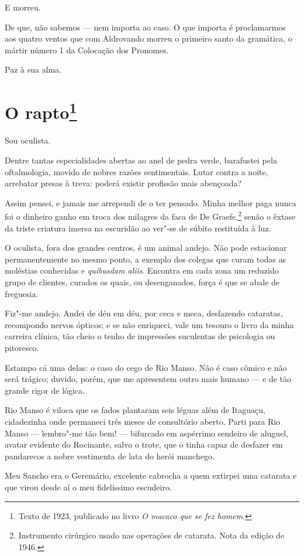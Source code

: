 E morreu.

De que, não sabemos --- nem importa ao caso. O que importa é
proclamarmos aos quatro ventos que com Aldrovando morreu o primeiro
santo da gramática, o mártir número 1 da Colocação dos Pronomes.

Paz à sua alma.

\chapter{O rapto\footnote[*]{Texto de 1923, publicado no livro \emph{O macaco que se fez homem}.}}

Sou oculista.

Dentre tantas especialidades abertas ao anel de pedra verde, barafustei
pela oftalmologia, movido de nobres razões sentimentais. Lutar contra a
noite, arrebatar presas à treva: poderá existir profissão mais
abençoada?

Assim pensei, e jamais me arrependi de o ter pensado. Minha melhor paga
nunca foi o dinheiro ganho em troca dos milagres da faca de De
Graefe,\footnote{Instrumento cirúrgico usado nas operações de catarata.
  Nota da edição de 1946.} senão o êxtase da triste criatura imersa na
escuridão ao ver"-se de súbito restituída à luz.

O oculista, fora dos grandes centros, é um animal andejo. Não pode
estacionar permanentemente no mesmo ponto, a exemplo dos colegas que
curam todas as moléstias conhecidas e \emph{quibusdam aliis}. Encontra
em cada zona um reduzido grupo de clientes, curados os quais, ou
desenganados, força é que se abale de freguesia.

Fiz"-me andejo. Andei de déu em déu, por ceca e meca, desfazendo
cataratas, recompondo nervos ópticos; e se não enriqueci, vale um
tesouro o livro da minha carreira clínica, tão cheio o tenho de
impressões suculentas de psicologia ou pitoresco.

Estampo cá uma delas: o caso do cego de Rio Manso. Não é caso cômico e
não será trágico; duvido, porém, que me apresentem outro mais humano ---
e de tão grande rigor de lógica.

Rio Manso é viloca que os fados plantaram seis léguas além de Itaguaçu,
cidadezinha onde permaneci três meses de consultório aberto. Parti para
Rio Manso --- lembro"-me tão bem! --- bifurcado em aspérrimo sendeiro de
aluguel, avatar evidente do Rocinante, salvo o trote, que o tinha capaz
de desfazer em pandarecos a nobre vestimenta de lata do herói manchego.

Meu Sancho era o Geremário, excelente cabrocha a quem extirpei uma
catarata e que virou desde aí o meu fidelíssimo escudeiro.

